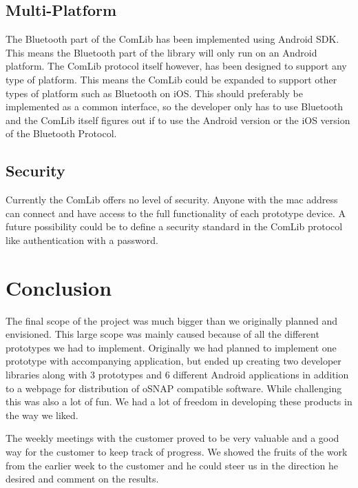 \subsection{Multi-Platform}
The Bluetooth part of the ComLib has been implemented using Android SDK. This means 
the Bluetooth part of the library will only run on an Android platform. The ComLib protocol
itself however, has been designed to support any type of platform. This means the ComLib
could be expanded to support other types of platform such as Bluetooth on iOS. This
should preferably be implemented as a common interface, so the developer only has to use
Bluetooth and the ComLib itself figures out if to use the Android version or the iOS version of
the Bluetooth Protocol.

\subsection{Security}
Currently the ComLib offers no level of security. Anyone with the mac address can connect
and have access to the full functionality of each prototype device. A future possibility could
be to define a security standard in the ComLib protocol like authentication with a password.

\section{Conclusion}
The final scope of the project was much bigger than we originally planned and envisioned. This large scope
was mainly caused because of all the different prototypes we had to implement. Originally we had planned
to implement one prototype with accompanying application, but ended up creating two developer libraries
along with 3 prototypes and 6 different Android applications in addition to a webpage for distribution of oSNAP
compatible software. While challenging this was also a lot of fun. We had a lot of freedom in developing
these products in the way we liked.

The weekly meetings with the customer proved to be very valuable and
a good way for the customer to keep track of progress. We showed the fruits of the work from the earlier
week to the customer and he could steer us in the direction he desired and comment on the results.